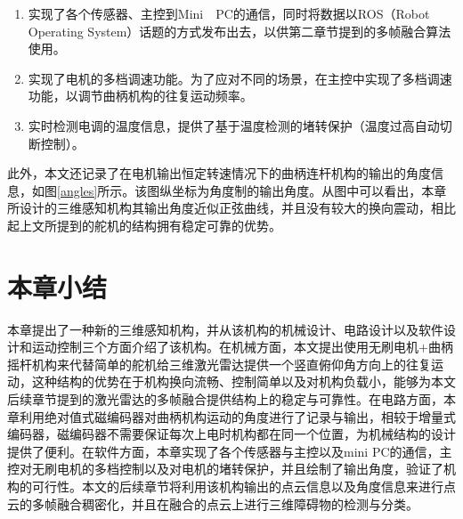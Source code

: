 \begin{enumerate}
    \item 实现了各个传感器、主控到Mini　PC的通信，同时将数据以ROS（Robot Operating System）话题的方式发布出去，以供第二章节提到的多帧融合算法使用。
    \item 实现了电机的多档调速功能。为了应对不同的场景，在主控中实现了多档调速功能，以调节曲柄机构的往复运动频率。
    \item 实时检测电调的温度信息，提供了基于温度检测的堵转保护（温度过高自动切断控制）。
\end{enumerate}

此外，本文还记录了在电机输出恒定转速情况下的曲柄连杆机构的输出的角度信息，如图\ref{angles}所示。该图纵坐标为角度制的输出角度。从图中可以看出，本章所设计的三维感知机构其输出角度近似正弦曲线，并且没有较大的换向震动，相比起上文所提到的舵机的结构拥有稳定可靠的优势。


\section{本章小结}

本章提出了一种新的三维感知机构，并从该机构的机械设计、电路设计以及软件设计和运动控制三个方面介绍了该机构。在机械方面，本文提出使用无刷电机$+$曲柄摇杆机构来代替简单的舵机给三维激光雷达提供一个竖直俯仰角方向上的往复运动，这种结构的优势在于机构换向流畅、控制简单以及对机构负载小，能够为本文后续章节提到的激光雷达的多帧融合提供结构上的稳定与可靠性。在电路方面，本章利用绝对值式磁编码器对曲柄机构运动的角度进行了记录与输出，相较于增量式编码器，磁编码器不需要保证每次上电时机构都在同一个位置，为机械结构的设计提供了便利。在软件方面，本章实现了各个传感器与主控以及mini PC的通信，主控对无刷电机的多档控制以及对电机的堵转保护，并且绘制了输出角度，验证了机构的可行性。本文的后续章节将利用该机构输出的点云信息以及角度信息来进行点云的多帧融合稠密化，并且在融合的点云上进行三维障碍物的检测与分类。